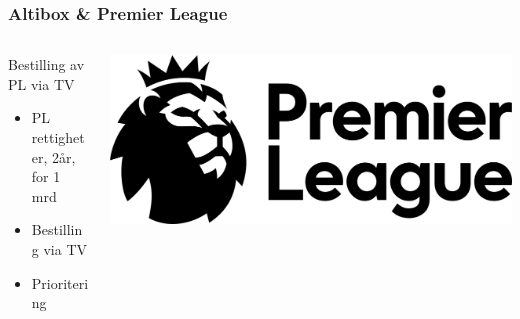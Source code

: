 \documentclass{beamer}
\begin{document}
    \begin{frame}
        \frametitle{Altibox \& Premier League}
        \begin{columns}[c]
            \begin{column}{.55\textwidth}
                \begin{block}{Bestilling av PL via TV}
                    \begin{itemize}
                        \item PL rettigheter, 2år, for 1 mrd
                        \item Bestilling via TV
                        \item Prioritering
                    \end{itemize}
                \end{block}
            \end{column}
            \begin{column}{.45\textwidth}
                \begin{center}
                    \includegraphics[width=\textwidth]{images/premier-league-smaller}
                \end{center}
            \end{column}
        \end{columns}
    \end{frame}
\end{document}
